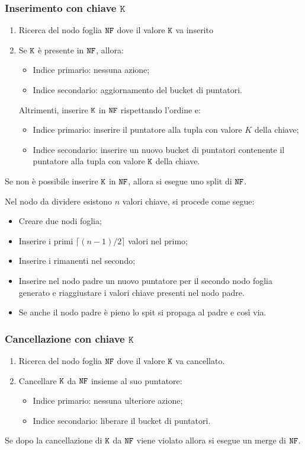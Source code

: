 \documentclass[oneside,a4paper,11pt]{book}
\theoremstyle{italicstyle}
\theoremstyle{normStyle}
\begin{document}
\subsubsection{Inserimento con chiave $\texttt{K}$}
\begin{enumerate}
  \item Ricerca del nodo foglia $\verb|NF|$ dove il valore $\verb|K|$ va inserito
  \item Se $\verb|K|$ è presente in $\verb|NF|$, allora:
  \begin{itemize}
    \item Indice primario: nessuna azione;
    \item Indice secondario: aggiornamento del bucket di puntatori.
  \end{itemize}
  Altrimenti, inserire $\verb|K|$ in $\verb|NF|$ rispettando l'ordine e:
  \begin{itemize}
    \item Indice primario: inserire il puntatore alla tupla con valore $K$ 
    della chiave;
    \item Indice secondario: inserire un nuovo bucket di puntatori contenente 
    il puntatore alla tupla con valore $\verb|K|$ della chiave.
  \end{itemize}
\end{enumerate}
Se non è possibile inserire $\verb|K|$ in $\verb|NF|$, allora si esegue uno split di $\verb|NF|$.

Nel nodo da dividere esistono $n$ valori chiave, si procede come segue:
\begin{itemize}
  \item Creare due nodi foglia;
  \item Inserire i primi $\lceil (n-1)/2\rceil$ valori nel primo;
  \item Inserire i rimanenti nel secondo;
  \item Inserire nel nodo padre un nuovo puntatore per il secondo nodo 
  foglia generato e riaggiustare i valori chiave presenti nel nodo padre.
  \item Se anche il nodo padre è pieno lo spit si propaga al padre e così via.
\end{itemize}
\subsubsection{Cancellazione con chiave $\texttt{K}$}
\begin{enumerate}
  \item Ricerca del nodo foglia $\verb|NF|$ dove il valore $\verb|K|$ va cancellato.
  \item Cancellare $\verb|K|$ da $\verb|NF|$ insieme al suo puntatore:
  \begin{itemize}
    \item Indice primario: nessuna ulteriore azione;
    \item Indice secondario: liberare il bucket di puntatori.
  \end{itemize}
\end{enumerate}
Se dopo la cancellazione di $\verb|K|$ da $\verb|NF|$ viene violato allora si esegue un merge di $\verb|NF|$.
\end{document}
